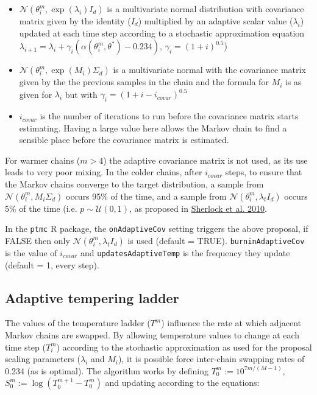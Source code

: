\documentclass[10pt,twoside]{report} %
\begin{document}
\begin{itemize}
\item $\mathcal{N}(\theta_i^m, \exp(\lambda_i)I_d)$ is a multivariate normal distribution with covariance matrix given by the identity ($I_d$) multiplied by an adaptive scalar value ($\lambda_i$) updated at each time step according to a stochastic approximation equation $\lambda_{i+1} = \lambda_i + \gamma_i(\alpha(\theta_i^m, \theta^*) - 0.234)$, $\gamma_i = (1+i)^{0.5}$)

\item $\mathcal{N}(\theta_i^m,  \exp(M_i)\Sigma_d)$ is a multivariate normal with the covariance matrix given by the the previous samples in the chain and the formula for $M_i$ is as given for $\lambda_i$ but with $\gamma_i = (1+i-i_{covar})^{0.5}$

\item $i_{covar}$ is the number of iterations to run before the covariance matrix starts estimating. Having a large value here allows the Markov chain to find a sensible place before the covariance matrix is estimated. 
\end{itemize}

For warmer chains ($m>4$) the adaptive covariance matrix is not used, as its use leads to very poor mixing. In the colder chains, after $i_{covar}$ steps, to ensure that the Markov chains converge to the target distribution, a sample from $\mathcal{N}(\theta_i^m,  M_i\Sigma_d)$ occurs 95\% of the time, and a sample from $\mathcal{N}(\theta_i^m, \lambda_tI_d)$ occurs 5\% of the time (i.e. $p \sim \mathcal{U}(0,1)$, as proposed in \href{https://projecteuclid.org/download/pdfview_1/euclid.ss/1290175840}{Sherlock et al. 2010}. 

In the \texttt{ptmc} R package, the \texttt{onAdaptiveCov} setting triggers the above proposal, if FALSE then only $\mathcal{N}(\theta_i^m, \lambda_t I_d)$ is used (default = TRUE). \texttt{burninAdaptiveCov} is the value of $i_{covar}$ and \texttt{updatesAdaptiveTemp} is the frequency they update (default = 1, every step).

\subsection{Adaptive tempering ladder}
The values of the temperature ladder ($T^m$) influence the rate at which adjacent Markov chains are swapped. By allowing temperature values to change at each time step ($T_i^m$) according to the stochastic approximation as used for the proposal scaling parameters ($\lambda_i$ and $M_i$), it is possible force inter-chain swapping rates of 0.234 (as is optimal). The algorithm works by defining $T^m_0 := 10^{7m/(M-1)}$, $S^{m}_{0} := \log(T^{m+1}_{0} - T^{m}_{0})$
and updating according to the equations:
\end{document}
